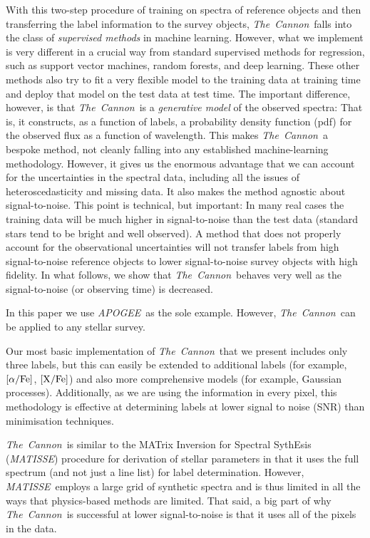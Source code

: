 \documentclass[12pt, preprint]{aastex}
\newcommand{\tc}{\textsl{The~Cannon}}
\newcommand{\apogee}{\textsl{APOGEE}}
\newcommand{\matisse}{\textsl{MATISSE}}
\newcommand{\xfe}{\mbox{$\rm [X/Fe]$}}
\newcommand{\alphafe}{\mbox{$\rm [\alpha/Fe]$}}
\begin{document}
With this two-step procedure of training on spectra of reference objects and then transferring the label information to the survey objects, \tc\ falls into the class of \emph{supervised methods} in machine learning. 
However, what we implement is very different in a crucial way from standard supervised methods for regression, such as support vector machines, random forests, and deep learning.
These other methods also try to fit a very flexible model to the training data at training time
and deploy that model on the test data at test time.
The important difference, however, is that \tc\ is a \emph{generative model} of the observed spectra:
That is, it constructs, as a function of labels, a probability density function (pdf) for the observed
flux as a function of wavelength. 
This makes \tc\ a bespoke method, not cleanly falling into any established machine-learning methodology.
However, it gives us the enormous advantage that we can account for the uncertainties in the spectral data,
including all the issues of heteroscedasticity and missing data.
It also makes the method agnostic about signal-to-noise.
This point is technical, but important:
In many real cases the training data will be much higher in signal-to-noise than the test data
(standard stars tend to be bright and well observed).
A method that does not properly account for the observational uncertainties will not transfer labels from high signal-to-noise reference objects to lower signal-to-noise survey objects with high fidelity.
In what follows, we show that \tc\ behaves very well as the signal-to-noise (or observing time) is decreased.

In this paper we use \apogee\ as the sole example. 
However, \tc\ can be applied to any stellar survey.  

Our most basic implementation of \tc\ that we present includes only three labels, but this can easily be extended to additional labels  (for example, \alphafe, \xfe) and also more comprehensive models (for example, Gaussian processes). 
Additionally, as we are using the information in every pixel, this methodology is effective at determining labels at lower signal to noise (SNR) than minimisation techniques.

\tc\ is similar to the MATrix Inversion for Spectral SythEsis (\matisse) procedure
for derivation of stellar parameters \citep{RB2006} in that it uses the full spectrum
(and not just a line list) for label determination.
However, \matisse\ employs a large grid of synthetic spectra
and is thus limited in all the ways that physics-based methods are limited.
That said, a big part of why \tc\ is successful at lower signal-to-noise
is that it uses all of the pixels in the data.
\end{document}
